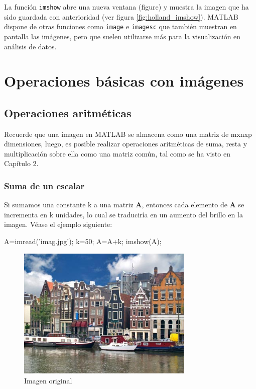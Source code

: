 La función \texttt{imshow} abre una nueva ventana (figure) y muestra la
imagen que ha sido guardada con anterioridad (ver figura \ref{fig:holland_imshow}). 
MATLAB dispone de otras funciones como \texttt{image} e \texttt{imagesc} que también muestran en pantalla las
imágenes, pero que suelen utilizarse más para la visualización en
análisis de datos.

\section{Operaciones básicas con imágenes}

\subsection{Operaciones aritméticas}

Recuerde que una imagen en MATLAB se almacena como una matriz de mxnxp
dimensiones, luego, es posible realizar operaciones aritméticas de suma,
resta y multiplicación sobre ella como una matriz común, tal como se ha
visto en Capítulo 2.

\subsubsection{Suma de un escalar}

Si sumamos una constante k a una matriz \textbf{A}, entonces cada
elemento de \textbf{A} se incrementa en k unidades, lo cual se
traduciría en un aumento del brillo en la imagen. Véase el ejemplo
siguiente:

\begin{matlab}
A=imread('imag.jpg');
k=50;
A=A+k;
imshow(A);
\end{matlab}

\begin{figure}[htbp]
    \centering
    \includegraphics[width=0.75\textwidth]{images/ch7/holland_original.png}
    \caption{Imagen original}
    \label{fig:holland_original}
\end{figure}


